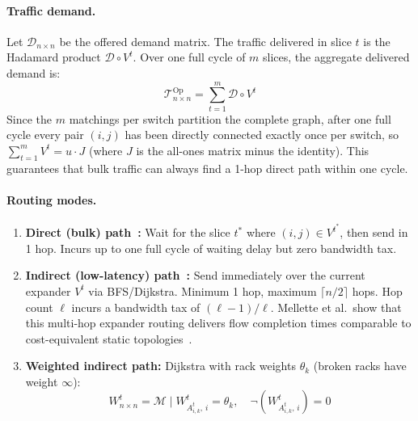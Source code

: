 \documentclass{article}
\begin{document}
    \paragraph{Traffic demand.}
    Let $\mathcal{D}_{n \times n}$ be the offered demand matrix. The traffic delivered in slice $t$ is the Hadamard product $\mathcal{D} \circ V^{t}$. Over one full cycle of $m$ slices, the aggregate delivered demand is:
    \[
        \mathcal{T}^{\text{Op}}_{n \times n} = \sum_{t=1}^{m} \mathcal{D} \circ V^{t}
    \]
    Since the $m$ matchings per switch partition the complete graph, after one full cycle every pair $(i,j)$ has been directly connected exactly once per switch, so $\sum_{t=1}^{m} V^{t} = u \cdot J$ (where $J$ is the all-ones matrix minus the identity). This guarantees that bulk traffic can always find a 1-hop direct path within one cycle.

    \paragraph{Routing modes.}
    \begin{enumerate}
        \item \textbf{Direct (bulk) path~\cite{opera}:} Wait for the slice $t^*$ where $(i,j) \in V^{t^*}$, then send in 1 hop. Incurs up to one full cycle of waiting delay but zero bandwidth tax.
        \item \textbf{Indirect (low-latency) path~\cite{opera}:} Send immediately over the current expander $V^t$ via BFS/Dijkstra. Minimum 1 hop, maximum $\lceil n/2 \rceil$ hops. Hop count $\ell$ incurs a bandwidth tax of $(\ell - 1)/\ell$. Mellette et al.\ show that this multi-hop expander routing delivers flow completion times comparable to cost-equivalent static topologies~\cite{opera}.
        \item \textbf{Weighted indirect path:} Dijkstra with rack weights $\theta_k$ (broken racks have weight $\infty$):
        \[
            W^{t}_{n \times n} = \mathscr{M} \mid W^{t}_{A^{t}_{i,k},\,i} = \theta_k, \quad \neg(W^{t}_{A^{t}_{i,k},\,i}) = 0
        \]
    \end{enumerate}
\end{document}
